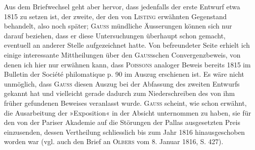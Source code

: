 \par\noindent\hspace*{\parindent}Aus dem Briefwechsel geht aber hervor, dass jedenfalls der erste
Entwurf etwa 1815 zu setzen ist, der zweite, der den von \textsc{Listing} erwähnten
Gegenstand behandelt, also noch später; \textsc{Gauss} mündliche Äusserungen können sich
nur darauf beziehen, dass er diese Untersuchungen überhaupt schon gemacht,
eventuell an anderer Stelle aufgezeichnet hatte. Von befreundeter Seite erhielt
ich einige interessante Mittheilungen über den \textsc{Gauss}schen Convergenzbeweis,
von denen ich hier nur erwähnen kann, dass \textsc{Poissons} analoger Beweis bereits
1815 im Bulletin der Société philomatique p. 90 im Auszug erschienen ist.
Es wäre nicht unmöglich, dass \textsc{Gauss} diesen Auszug bei der Abfassung des zweiten
Entwurfs gekannt hat und vielleicht gerade dadurch zum Niederschreiben des von ihm
früher gefundenen Beweises veranlasst wurde. \textsc{Gauss} scheint, wie schon erwähnt,
die Ausarbeitung der »Exposition« in der Absicht unternommen zu haben, sie für den
von der Pariser Akademie auf die Störungen der Pallas ausgesetzten Preis
einzusenden, dessen Vertheilung schliesslich bis zum Jahr 1816 hinausgeschoben
worden war (vgl. auch den Brief an \textsc{Olbers} vom 8. Januar 1816, S. 427).
\endgroup
